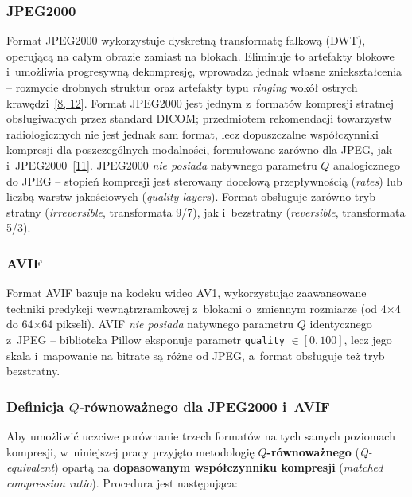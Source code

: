 \documentclass[12pt,a4paper]{article}
\newcommand{\mycite}[1]{\hyperlink{bib#1}{[#1]}}
\begin{document}
\subsubsection{JPEG2000}
Format JPEG2000 wykorzystuje dyskretną transformatę falkową (DWT), operującą na całym obrazie zamiast na blokach. Eliminuje to artefakty blokowe i~umożliwia progresywną dekompresję, wprowadza jednak własne zniekształcenia -- rozmycie drobnych struktur oraz artefakty typu \textit{ringing} wokół ostrych krawędzi~\mycite{8, 12}. Format JPEG2000 jest jednym z~formatów kompresji stratnej obsługiwanych przez standard DICOM; przedmiotem rekomendacji towarzystw radiologicznych nie jest jednak sam format, lecz dopuszczalne współczynniki kompresji dla poszczególnych modalności, formułowane zarówno dla JPEG, jak i~JPEG2000~\mycite{11}. JPEG2000 \emph{nie posiada} natywnego parametru $Q$ analogicznego do JPEG -- stopień kompresji jest sterowany docelową przepływnością (\textit{rates}) lub liczbą warstw jakościowych (\textit{quality layers}). Format obsługuje zarówno tryb stratny (\textit{irreversible}, transformata 9/7), jak i~bezstratny (\textit{reversible}, transformata 5/3).

\subsubsection{AVIF}
Format AVIF bazuje na kodeku wideo AV1, wykorzystując zaawansowane techniki predykcji wewnątrzramkowej z~blokami o~zmiennym rozmiarze (od 4$\times$4 do 64$\times$64 pikseli). AVIF \emph{nie posiada} natywnego parametru $Q$ identycznego z~JPEG -- biblioteka Pillow eksponuje parametr \texttt{quality} $\in [0, 100]$, lecz jego skala i~mapowanie na bitrate są różne od JPEG, a~format obsługuje też tryb bezstratny.

\subsubsection{Definicja $Q$-równoważnego dla JPEG2000 i~AVIF}
\label{sec:q_equivalent}

Aby umożliwić uczciwe porównanie trzech formatów na tych samych poziomach kompresji, w~niniejszej pracy przyjęto metodologię \textbf{$Q$-równoważnego} (\textit{Q-equivalent}) opartą na \textbf{dopasowanym współczynniku kompresji} (\textit{matched compression ratio}). Procedura jest następująca:
\end{document}
